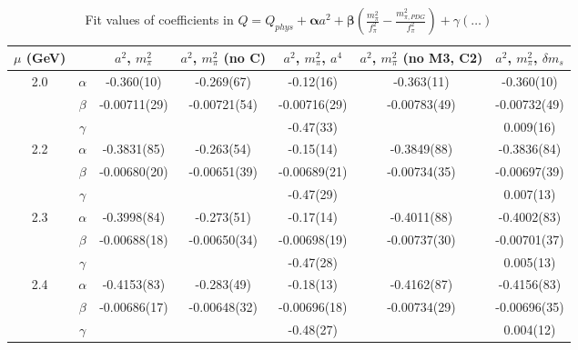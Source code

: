 \documentclass[12pt]{extarticle}
\begin{document}
\begin{table}[h!]
\begin{center}
\begin{tabular}{|c c|c|c|c|c|c|}
\hline
$\mu$ (GeV) &  & $a^2$, $m_\pi^2$& $a^2$, $m_\pi^2$ (no C)& $a^2$, $m_\pi^2$, $a^4$& $a^2$, $m_\pi^2$ (no M3, C2)& $a^2$, $m_\pi^2$, $\delta m_s$\\
\hline
\multirow{3}{0.5in}{2.0} & $\alpha$ & -0.360(10)& -0.269(67)& -0.12(16)& -0.363(11)& -0.360(10)\\
 & $\beta$ & -0.00711(29)& -0.00721(54)& -0.00716(29)& -0.00783(49)& -0.00732(49)\\
 & $\gamma$ &  &  & -0.47(33)&  & 0.009(16)\\
\hline
\multirow{3}{0.5in}{2.2} & $\alpha$ & -0.3831(85)& -0.263(54)& -0.15(14)& -0.3849(88)& -0.3836(84)\\
 & $\beta$ & -0.00680(20)& -0.00651(39)& -0.00689(21)& -0.00734(35)& -0.00697(39)\\
 & $\gamma$ &  &  & -0.47(29)&  & 0.007(13)\\
\hline
\multirow{3}{0.5in}{2.3} & $\alpha$ & -0.3998(84)& -0.273(51)& -0.17(14)& -0.4011(88)& -0.4002(83)\\
 & $\beta$ & -0.00688(18)& -0.00650(34)& -0.00698(19)& -0.00737(30)& -0.00701(37)\\
 & $\gamma$ &  &  & -0.47(28)&  & 0.005(13)\\
\hline
\multirow{3}{0.5in}{2.4} & $\alpha$ & -0.4153(83)& -0.283(49)& -0.18(13)& -0.4162(87)& -0.4156(83)\\
 & $\beta$ & -0.00686(17)& -0.00648(32)& -0.00696(18)& -0.00734(29)& -0.00696(35)\\
 & $\gamma$ &  &  & -0.48(27)&  & 0.004(12)\\
\hline
\end{tabular}
\caption{Fit values of coefficients in $Q = Q_{phys} + \mathbf{\alpha} a^2 + \mathbf{\beta}\left(\frac{m_\pi^2}{f_\pi^2}-\frac{m_{\pi,PDG}^2}{f_\pi^2}\right) + \gamma(\ldots)$}
\end{center}
\end{table}




















\clearpage
\end{document}
